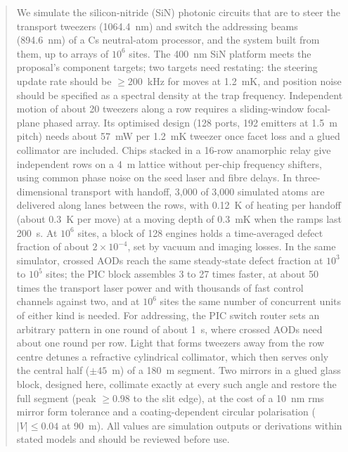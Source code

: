 \begin{abstract}
We simulate the silicon-nitride (SiN) photonic circuits that are to steer the transport tweezers (1064.4~nm) and
switch the addressing beams (894.6~nm) of a Cs neutral-atom processor, and the system built from them, up to
arrays of $10^6$ sites. The 400~nm SiN platform meets the proposal's component targets; two targets need
restating: the steering update rate should be $\geq 200$~kHz for moves at 1.2~mK, and position noise should be
specified as a spectral density at the trap frequency. Independent motion of about 20 tweezers along a row
requires a sliding-window focal-plane phased array. Its optimised design (128 ports, 192 emitters at 1.5~\textmu m
pitch) needs about 57~mW per 1.2~mK tweezer once facet loss and a glued collimator are included. Chips stacked in a
16-row anamorphic relay give independent rows on a 4~\textmu m lattice without per-chip frequency shifters, using
common phase noise on the seed laser and fibre delays. In three-dimensional transport with handoff, 3,000 of 3,000
simulated atoms are delivered along lanes between the rows, with 0.12~\textmu K of heating per handoff (about 0.3~\textmu K per move) at a
moving depth of 0.3~mK when the ramps last 200~\textmu s. At $10^6$ sites, a block of 128 engines holds a
time-averaged defect fraction of about $2\times10^{-4}$, set by vacuum and imaging losses. In the same simulator,
crossed AODs reach the same steady-state defect fraction at $10^3$ to $10^5$ sites; the PIC block assembles 3 to 27
times faster, at about 50 times the transport laser power and with thousands of fast control channels against
two, and at $10^6$ sites the same number of concurrent units of either kind is needed. For addressing, the PIC switch
router sets an arbitrary pattern in one round of about 1~\textmu s, where crossed AODs need about one round per row. Light that forms tweezers
away from the row centre detunes a refractive cylindrical collimator, which then serves only the central half
($\pm45$~\textmu m) of a 180~\textmu m segment. Two mirrors in a glued glass block, designed here, collimate exactly
at every such angle and restore the full segment (peak $\geq0.98$ to the slit edge), at the cost of a 10~nm rms
mirror form tolerance and a coating-dependent circular polarisation ($|V|\leq0.04$ at 90~\textmu m). All values are simulation
outputs or derivations within stated models and should be reviewed before use.
\end{abstract}
